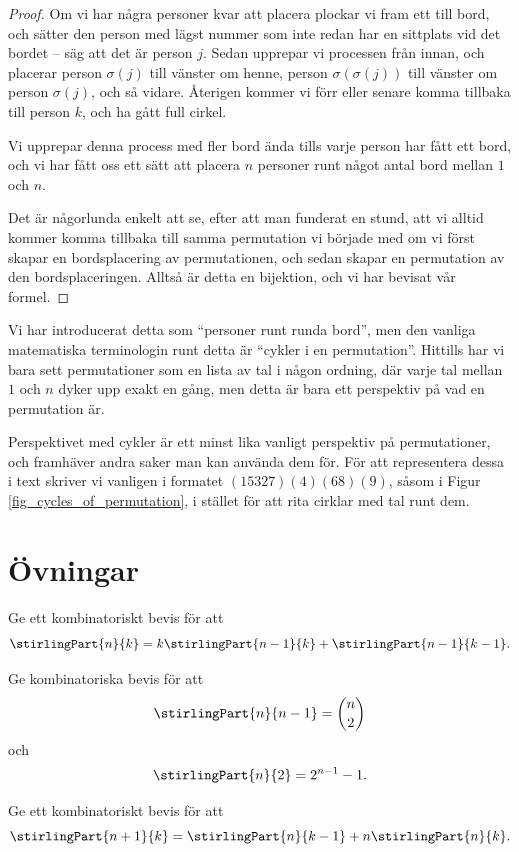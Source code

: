 \documentclass[nobib]{tufte-handout}
\begin{document}
\begin{theorem}
\begin{proof}
    Om vi har några personer kvar att placera plockar vi fram ett till bord, och sätter den person med lägst nummer som inte redan har en sittplats vid det bordet -- säg att det är person $j$. Sedan upprepar vi processen från innan, och placerar person $\sigma(j)$ till vänster om henne, person $\sigma(\sigma(j))$ till vänster om person $\sigma(j)$, och så vidare. Återigen kommer vi förr eller senare komma tillbaka till person $k$, och ha gått full cirkel.

    Vi upprepar denna process med fler bord ända tills varje person har fått ett bord, och vi har fått oss ett sätt att placera $n$ personer runt något antal bord mellan $1$ och $n$.

    Det är någorlunda enkelt att se, efter att man funderat en stund, att vi alltid kommer komma tillbaka till samma permutation vi började med om vi först skapar en bordsplacering av permutationen, och sedan skapar en permutation av den bordsplaceringen. Alltså är detta en bijektion, och vi har bevisat vår formel.
  \end{proof}
\end{theorem}

\begin{remark}
  Vi har introducerat detta som ``personer runt runda bord'', men den vanliga matematiska terminologin runt detta är ``cykler i en permutation''. Hittills har vi bara sett permutationer som en lista av tal i någon ordning, där varje tal mellan $1$ och $n$ dyker upp exakt en gång, men detta är bara ett perspektiv på vad en permutation är.

  Perspektivet med cykler är ett minst lika vanligt perspektiv på permutationer, och framhäver andra saker man kan använda dem för. För att representera dessa i text skriver vi vanligen i formatet $(15327)(4)(68)(9)$, såsom i Figur \ref{fig_cycles_of_permutation}, i stället för att rita cirklar med tal runt dem.
\end{remark}

\section{Övningar}

\begin{xca}
  Ge ett kombinatoriskt bevis för att
  $$\stirlingPart{n}{k} = k\stirlingPart{n-1}{k} + \stirlingPart{n-1}{k-1}.$$
\end{xca}

\begin{xca}
  Ge kombinatoriska bevis för att
  $$\stirlingPart{n}{n-1} = \binom{n}{2}$$
  och
  $$\stirlingPart{n}{2} = 2^{n-1} - 1.$$
\end{xca}

\begin{xca}
  Ge ett kombinatoriskt bevis för att
  $$\stirlingPart{n+1}{k} = \stirlingPart{n}{k-1} + n\stirlingPart{n}{k}.$$
\end{xca}

%
%
\end{document}
